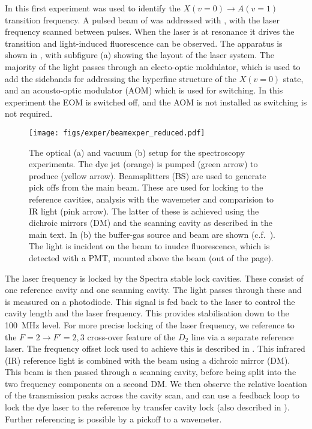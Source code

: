 In this first experiment  was used to identify the $X(v=0)
\rightarrow A(v=1)$ transition frequency. A pulsed beam of \CaF{} was addressed
with , with the laser frequency scanned between pulses.  When the
laser is at resonance it drives the transition and light-induced fluorescence
can be observed. The apparatus is shown in , with
subfigure (a) showing the layout of the  laser system. The
majority of the light passes through an electo-optic moldulator, which is used
to add the sidebands for addressing the hyperfine structure of the $X(v=0)$
state, and an acousto-optic modulator (AOM) which is used for switching. In
this experiment the EOM is switched off, and the AOM is not installed as
switching is not required.

\begin{figure}
  \centering
  \texttt{[image: figs/exper/beamexper\_reduced.pdf]}
  \caption{The optical (a) and vacuum (b) setup for the spectroscopy
    experiments. The dye jet (orange) is pumped (green
    arrow) to produce  (yellow arrow). Beamsplitters (BS) are used
    to generate pick offs from the main beam. These are used for locking to the
    reference cavities, analysis with the wavemeter and comparision to IR light
    (pink arrow). The latter of these is achieved using the dichroic mirrors
    (DM) and  the scanning cavity as described in the main text. In (b) the
    buffer-gas source and \CaF{} beam are shown
    (c.f.~). The  light is
    incident on the beam to inudce fluorescence, which is detected with a PMT,
    mounted above the beam (out of the page).
  }
  \label{exper:fig:beamapp} 
\end{figure}

The laser frequency is locked by the Spectra stable lock cavities. These
consist of one reference cavity and one scanning cavity. The light passes
through these and is measured on a photodiode. This signal is fed back to the
laser to control the cavity length and the laser frequency. This provides
stabilisation down to the \SI{100}{\mega\hertz} level. For more precise locking
of the laser frequency, we reference  to the $F=2 \rightarrow
F'=2, 3$ cross-over feature of the \esRb{} $D_2$ line via a separate reference
laser. The frequency offset lock used to achieve this is described in
. This infrared (IR) reference light is combined with
the  beam using  a dichroic mirror (DM). This beam is then passed
through a scanning cavity, before being split into the two frequency components
on a second DM. We then observe the relative location of the transmission peaks
across the cavity scan, and can use a feedback loop to lock the dye laser to
the reference by transfer cavity lock (also described in
). Further referencing is possible by a pickoff to a
wavemeter. %

